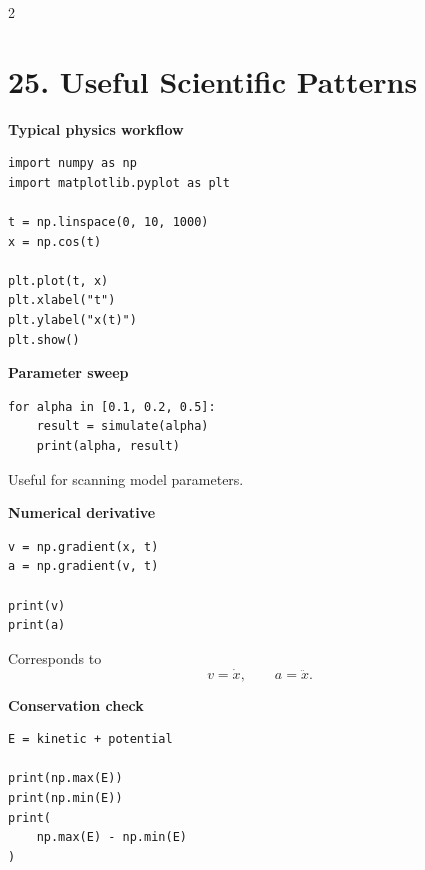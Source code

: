 \documentclass[10pt,a4paper]{article}
\begin{document}
\newpage

\begin{multicols}{2}
\raggedcolumns

\section*{25. Useful Scientific Patterns}

\begin{card}
\textbf{Typical physics workflow}

\begin{lstlisting}[style=pythonstyle]
import numpy as np
import matplotlib.pyplot as plt

t = np.linspace(0, 10, 1000)
x = np.cos(t)

plt.plot(t, x)
plt.xlabel("t")
plt.ylabel("x(t)")
plt.show()
\end{lstlisting}
\end{card}

\begin{card}
\textbf{Parameter sweep}

\begin{lstlisting}[style=pythonstyle]
for alpha in [0.1, 0.2, 0.5]:
    result = simulate(alpha)
    print(alpha, result)
\end{lstlisting}

Useful for scanning model parameters.
\end{card}

\begin{card}
\textbf{Numerical derivative}

\begin{lstlisting}[style=pythonstyle]
v = np.gradient(x, t)
a = np.gradient(v, t)

print(v)
print(a)
\end{lstlisting}

Corresponds to
\[
v=\dot{x},
\qquad
a=\ddot{x}.
\]
\end{card}

\begin{card}
\textbf{Conservation check}

\begin{lstlisting}[style=pythonstyle]
E = kinetic + potential

print(np.max(E))
print(np.min(E))
print(
    np.max(E) - np.min(E)
)
\end{lstlisting}


\end{card}
\end{multicols}
\end{document}

